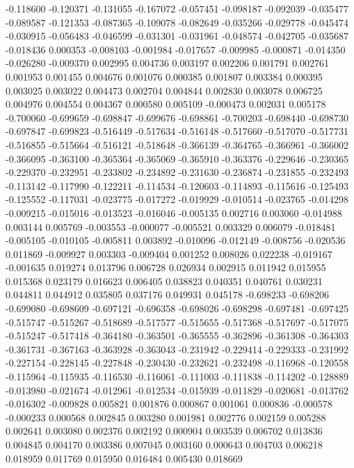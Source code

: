 -0.118600
-0.120371
-0.131055
-0.167072
-0.057451
-0.098187
-0.092039
-0.035477
-0.089587
-0.121353
-0.087365
-0.109078
-0.082649
-0.035266
-0.029778
-0.045474
-0.030915
-0.056483
-0.046599
-0.031301
-0.031961
-0.048574
-0.042705
-0.035687
-0.018436
0.000353
-0.008103
-0.001984
-0.017657
-0.009985
-0.000871
-0.014350
-0.026280
-0.009370
0.002995
0.004736
0.003197
0.002206
0.001791
0.002761
0.001953
0.001455
0.004676
0.001076
0.000385
0.001807
0.003384
0.000395
0.003025
0.003022
0.004473
0.002704
0.004844
0.002830
0.003078
0.006725
0.004976
0.004554
0.004367
0.000580
0.005109
-0.000473
0.002031
0.005178
-0.700060
-0.699659
-0.698847
-0.699676
-0.698861
-0.700203
-0.698440
-0.698730
-0.697847
-0.699823
-0.516449
-0.517634
-0.516148
-0.517660
-0.517070
-0.517731
-0.516855
-0.515664
-0.516121
-0.518648
-0.366139
-0.364765
-0.366961
-0.366002
-0.366095
-0.363100
-0.365364
-0.365069
-0.365910
-0.363376
-0.229646
-0.230365
-0.229370
-0.232951
-0.233802
-0.234892
-0.231630
-0.236874
-0.231855
-0.232493
-0.113142
-0.117990
-0.122211
-0.114534
-0.120603
-0.114893
-0.115616
-0.125493
-0.125552
-0.117031
-0.023775
-0.017272
-0.019929
-0.010514
-0.023765
-0.014298
-0.009215
-0.015016
-0.013523
-0.016046
-0.005135
0.002716
0.003060
-0.014988
0.003144
0.005769
-0.003553
-0.000077
-0.005521
0.003329
0.006079
-0.018481
-0.005105
-0.010105
-0.005811
0.003892
-0.010096
-0.012149
-0.008756
-0.020536
0.011869
-0.009927
0.003303
-0.009404
0.001252
0.008026
0.022238
-0.019167
-0.001635
0.019274
0.013796
0.006728
0.026934
0.002915
0.011942
0.015955
0.015368
0.023179
0.016623
0.006405
0.038823
0.040351
0.040761
0.030231
0.044811
0.044912
0.035805
0.037176
0.049931
0.045178
-0.698233
-0.698206
-0.699080
-0.698609
-0.697121
-0.696358
-0.698026
-0.698298
-0.697481
-0.697425
-0.515747
-0.515267
-0.518689
-0.517577
-0.515655
-0.517368
-0.517697
-0.517075
-0.515247
-0.517418
-0.364180
-0.363501
-0.365555
-0.362896
-0.361308
-0.364303
-0.361731
-0.367163
-0.363928
-0.363043
-0.231942
-0.229414
-0.229333
-0.231992
-0.227154
-0.228145
-0.227848
-0.230430
-0.232621
-0.232498
-0.116968
-0.120558
-0.115964
-0.115935
-0.116530
-0.116061
-0.111003
-0.111838
-0.114202
-0.128889
-0.013980
-0.021674
-0.012961
-0.012534
-0.015939
-0.011829
-0.020681
-0.013762
-0.016302
-0.009828
0.005821
0.001876
0.000867
0.001061
0.000836
-0.000578
-0.000233
0.000568
0.002845
0.003280
0.001981
0.002776
0.002159
0.005288
0.002641
0.003080
0.002376
0.002192
0.000904
0.003539
0.006702
0.013836
0.004845
0.004170
0.003386
0.007045
0.003160
0.000643
0.004703
0.006218
0.018959
0.011769
0.015950
0.016484
0.005430
0.018669
